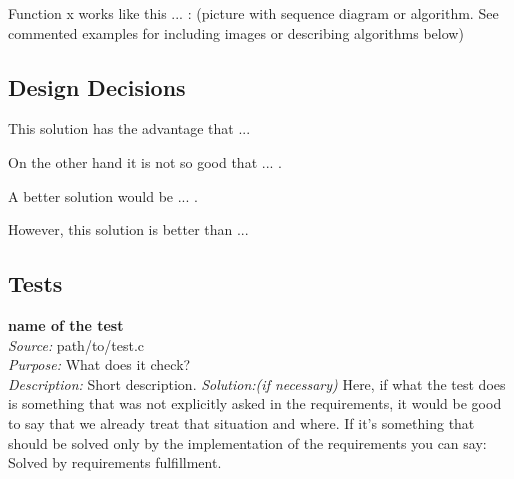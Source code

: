 	Function x works like this ... : (picture with sequence diagram or algorithm. See commented examples for including images or describing algorithms below)






    \subsection{Design Decisions}

	This solution has the advantage that ... 

	On the other hand it is not so good that ... . 

	A better solution would be ... . 

	However, this solution is better than ...

    \subsection{Tests}

    \textbf{name of the test}\\
    \textit{Source:} path/to/test.c\\
    \textit{Purpose:} What does it check?\\
    \textit{Description:} Short description.
    \textit{Solution:(if necessary)} Here, if what the test does is something that was not explicitly asked in the requirements, it would be good to say that we already treat that situation and where. If it's something that should be solved only by the implementation of the requirements you can say: Solved by requirements fulfillment.
